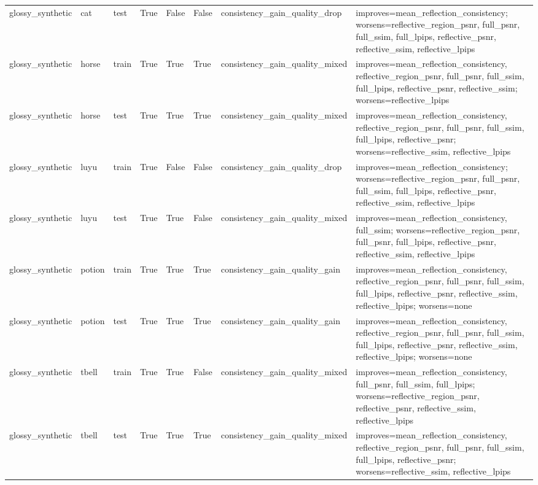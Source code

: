 \begin{tabular}{llllllll}
glossy\_synthetic & cat & test & True & False & False & consistency\_gain\_quality\_drop & improves=mean\_reflection\_consistency; worsens=reflective\_region\_psnr, full\_psnr, full\_ssim, full\_lpips, reflective\_psnr, reflective\_ssim, reflective\_lpips \\
glossy\_synthetic & horse & train & True & True & True & consistency\_gain\_quality\_mixed & improves=mean\_reflection\_consistency, reflective\_region\_psnr, full\_psnr, full\_ssim, full\_lpips, reflective\_psnr, reflective\_ssim; worsens=reflective\_lpips \\
glossy\_synthetic & horse & test & True & True & True & consistency\_gain\_quality\_mixed & improves=mean\_reflection\_consistency, reflective\_region\_psnr, full\_psnr, full\_ssim, full\_lpips, reflective\_psnr; worsens=reflective\_ssim, reflective\_lpips \\
glossy\_synthetic & luyu & train & True & False & False & consistency\_gain\_quality\_drop & improves=mean\_reflection\_consistency; worsens=reflective\_region\_psnr, full\_psnr, full\_ssim, full\_lpips, reflective\_psnr, reflective\_ssim, reflective\_lpips \\
glossy\_synthetic & luyu & test & True & True & False & consistency\_gain\_quality\_mixed & improves=mean\_reflection\_consistency, full\_ssim; worsens=reflective\_region\_psnr, full\_psnr, full\_lpips, reflective\_psnr, reflective\_ssim, reflective\_lpips \\
glossy\_synthetic & potion & train & True & True & True & consistency\_gain\_quality\_gain & improves=mean\_reflection\_consistency, reflective\_region\_psnr, full\_psnr, full\_ssim, full\_lpips, reflective\_psnr, reflective\_ssim, reflective\_lpips; worsens=none \\
glossy\_synthetic & potion & test & True & True & True & consistency\_gain\_quality\_gain & improves=mean\_reflection\_consistency, reflective\_region\_psnr, full\_psnr, full\_ssim, full\_lpips, reflective\_psnr, reflective\_ssim, reflective\_lpips; worsens=none \\
glossy\_synthetic & tbell & train & True & True & False & consistency\_gain\_quality\_mixed & improves=mean\_reflection\_consistency, full\_psnr, full\_ssim, full\_lpips; worsens=reflective\_region\_psnr, reflective\_psnr, reflective\_ssim, reflective\_lpips \\
glossy\_synthetic & tbell & test & True & True & True & consistency\_gain\_quality\_mixed & improves=mean\_reflection\_consistency, reflective\_region\_psnr, full\_psnr, full\_ssim, full\_lpips, reflective\_psnr; worsens=reflective\_ssim, reflective\_lpips \\

\end{tabular}
